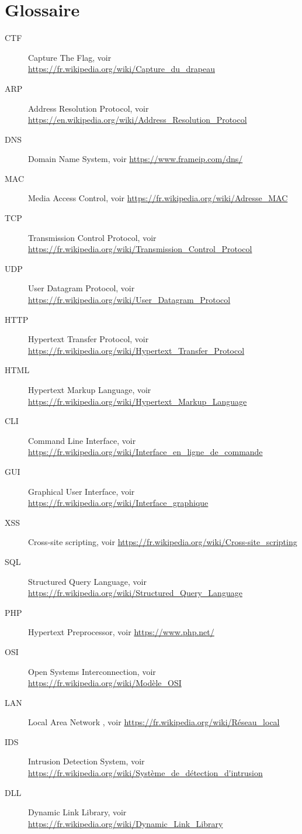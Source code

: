 \chapter{Glossaire}

\begin{description}
\item[CTF] Capture The Flag, voir \url{https://fr.wikipedia.org/wiki/Capture_du_drapeau}
\item[ARP] Address Resolution Protocol, voir \url{https://en.wikipedia.org/wiki/Address_Resolution_Protocol}
\item[DNS] Domain Name System, voir \url{https://www.frameip.com/dns/}
\item[MAC] Media Access Control, voir \url{https://fr.wikipedia.org/wiki/Adresse_MAC}
\item[TCP] Transmission Control Protocol, voir \url{https://fr.wikipedia.org/wiki/Transmission_Control_Protocol}
\item[UDP] User Datagram Protocol, voir \url{https://fr.wikipedia.org/wiki/User_Datagram_Protocol}
\item[HTTP] Hypertext Transfer Protocol, voir \url{https://fr.wikipedia.org/wiki/Hypertext_Transfer_Protocol}
\item[HTML] Hypertext Markup Language, voir \url{https://fr.wikipedia.org/wiki/Hypertext_Markup_Language}
\item[CLI] Command Line Interface, voir \url{https://fr.wikipedia.org/wiki/Interface_en_ligne_de_commande}
\item[GUI] Graphical User Interface, voir \url{https://fr.wikipedia.org/wiki/Interface_graphique}
\item[XSS] Cross-site scripting, voir \url{https://fr.wikipedia.org/wiki/Cross-site_scripting}
\item[SQL] Structured Query Language, voir \url{https://fr.wikipedia.org/wiki/Structured_Query_Language}
\item[PHP] Hypertext Preprocessor, voir \url{https://www.php.net/}
\item[OSI] Open Systems Interconnection, voir \url{https://fr.wikipedia.org/wiki/Modèle_OSI}
\item[LAN] Local Area Network , voir \url{https://fr.wikipedia.org/wiki/Réseau_local}
\item[IDS] Intrusion Detection System, voir \url{https://fr.wikipedia.org/wiki/Système_de_détection_d'intrusion}
\item[DLL] Dynamic Link Library, voir  \url{https://fr.wikipedia.org/wiki/Dynamic_Link_Library}
\end{description}
